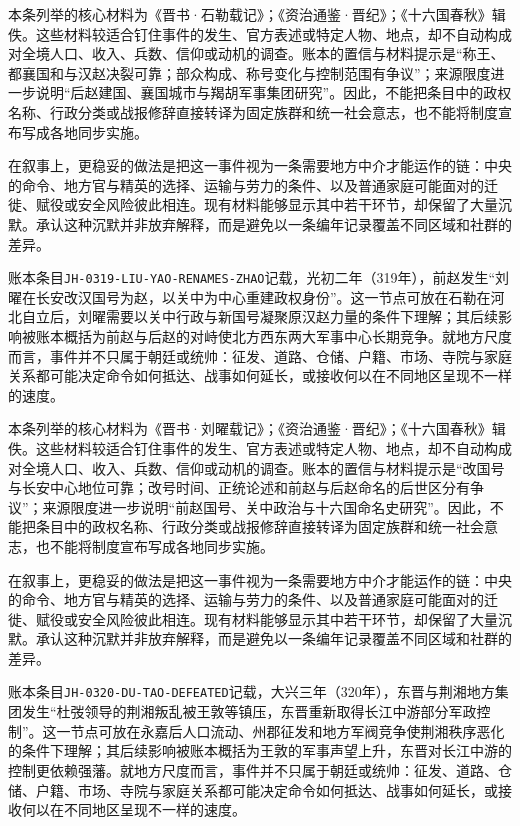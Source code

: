 本条列举的核心材料为《晋书·石勒载记》；《资治通鉴·晋纪》；《十六国春秋》辑佚。这些材料较适合钉住事件的发生、官方表述或特定人物、地点，却不自动构成对全境人口、收入、兵数、信仰或动机的调查。账本的置信与材料提示是“称王、都襄国和与汉赵决裂可靠；部众构成、称号变化与控制范围有争议”；来源限度进一步说明“后赵建国、襄国城市与羯胡军事集团研究”。因此，不能把条目中的政权名称、行政分类或战报修辞直接转译为固定族群和统一社会意志，也不能将制度宣布写成各地同步实施。

在叙事上，更稳妥的做法是把这一事件视为一条需要地方中介才能运作的链：中央的命令、地方官与精英的选择、运输与劳力的条件、以及普通家庭可能面对的迁徙、赋役或安全风险彼此相连。现有材料能够显示其中若干环节，却保留了大量沉默。承认这种沉默并非放弃解释，而是避免以一条编年记录覆盖不同区域和社群的差异。

账本条目\texttt{JH-0319-LIU-YAO-RENAMES-ZHAO}记载，光初二年（319年），前赵发生“刘曜在长安改汉国号为赵，以关中为中心重建政权身份”。这一节点可放在石勒在河北自立后，刘曜需要以关中行政与新国号凝聚原汉赵力量的条件下理解；其后续影响被账本概括为前赵与后赵的对峙使北方西东两大军事中心长期竞争。就地方尺度而言，事件并不只属于朝廷或统帅：征发、道路、仓储、户籍、市场、寺院与家庭关系都可能决定命令如何抵达、战事如何延长，或接收何以在不同地区呈现不一样的速度。

本条列举的核心材料为《晋书·刘曜载记》；《资治通鉴·晋纪》；《十六国春秋》辑佚。这些材料较适合钉住事件的发生、官方表述或特定人物、地点，却不自动构成对全境人口、收入、兵数、信仰或动机的调查。账本的置信与材料提示是“改国号与长安中心地位可靠；改号时间、正统论述和前赵与后赵命名的后世区分有争议”；来源限度进一步说明“前赵国号、关中政治与十六国命名史研究”。因此，不能把条目中的政权名称、行政分类或战报修辞直接转译为固定族群和统一社会意志，也不能将制度宣布写成各地同步实施。

在叙事上，更稳妥的做法是把这一事件视为一条需要地方中介才能运作的链：中央的命令、地方官与精英的选择、运输与劳力的条件、以及普通家庭可能面对的迁徙、赋役或安全风险彼此相连。现有材料能够显示其中若干环节，却保留了大量沉默。承认这种沉默并非放弃解释，而是避免以一条编年记录覆盖不同区域和社群的差异。

账本条目\texttt{JH-0320-DU-TAO-DEFEATED}记载，大兴三年（320年），东晋与荆湘地方集团发生“杜弢领导的荆湘叛乱被王敦等镇压，东晋重新取得长江中游部分军政控制”。这一节点可放在永嘉后人口流动、州郡征发和地方军阀竞争使荆湘秩序恶化的条件下理解；其后续影响被账本概括为王敦的军事声望上升，东晋对长江中游的控制更依赖强藩。就地方尺度而言，事件并不只属于朝廷或统帅：征发、道路、仓储、户籍、市场、寺院与家庭关系都可能决定命令如何抵达、战事如何延长，或接收何以在不同地区呈现不一样的速度。

